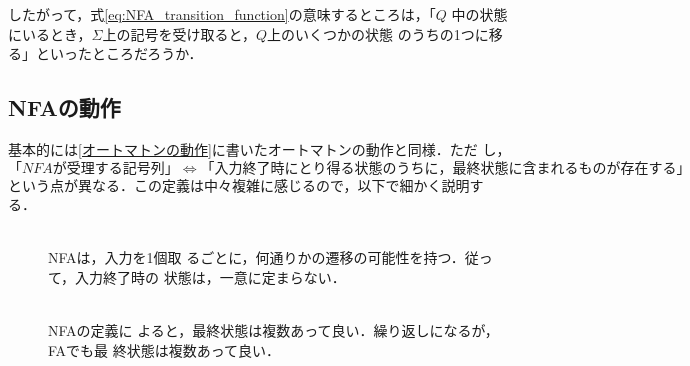 したがって，式\ref{eq:NFA_transition_function}の意味するところは，「$Q$
中の状態にいるとき，$\Sigma$上の記号を受け取ると，$Q$上のいくつかの状態
のうちの1つに移る」といったところだろうか．

\subsection{NFAの動作}
基本的には\ref{オートマトンの動作}に書いたオートマトンの動作と同様．ただ
し，
\[
 「NFAが受理する記号列」\Leftrightarrow「入力終了時にとり得る状態のうち
 に，最終状態に含まれるものが存在する」
\]
という点が異なる．この定義は中々複雑に感じるので，以下で細かく説明す
る．

\begin{description}
 \item[] \mbox{} \\
NFAは，入力を1個取
            るごとに，何通りかの遷移の可能性を持つ．従って，入力終了時の
            状態は，一意に定まらない．
 \item[] \mbox{} \\
NFAの定義に
            よると，最終状態は複数あって良い．繰り返しになるが，FAでも最
            終状態は複数あって良い．
\end{description}


